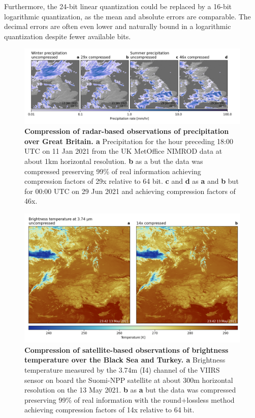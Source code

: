 Furthermore, the 24-bit linear quantization could be replaced by a 16-bit logarithmic quantization, as the mean and absolute errors
are comparable. The decimal errors are often even lower and naturally bound in a logarithmic quantization despite fewer available bits.

\begin{figure}[tbhp]
	\includegraphics[width=1\textwidth]{Figures/compression/precipitation_compression.png}
	\caption{\textbf{Compression of radar-based observations of precipitation over Great Britain. a}
	Precipitation for the hour preceding 18:00 UTC on 11 Jan 2021 from the UK MetOffice NIMROD data at about 1km
	horizontal resolution. \textbf{b} as a but the data was compressed preserving 99\% of real information achieving
	compression factors of 29x relative to 64 bit. \textbf{c} and \textbf{d} as \textbf{a} and \textbf{b} but for 00:00 UTC
	on 29 Jun 2021 and achieving compression factors of 46x.}
	\label{fig:precipitation}
\end{figure}

\begin{figure}[tbhp]
	\includegraphics[width=1\textwidth]{Figures/compression/brightness_temp.png}
	\caption{\textbf{Compression of satellite-based observations of brightness temperature over the
	Black Sea and Turkey. a} Brightness temperature measured by the 3.74\textmu m (I4) channel of
	the VIIRS sensor on board the Suomi-NPP satellite at about 300m horizontal resolution on
	the 13 May 2021. \textbf{b} as \textbf{a} but the data was compressed preserving 99\% of
	real information with the round+lossless method achieving compression factors of 14x
	relative to 64 bit.}
	\label{fig:brightness_temp}
\end{figure}

